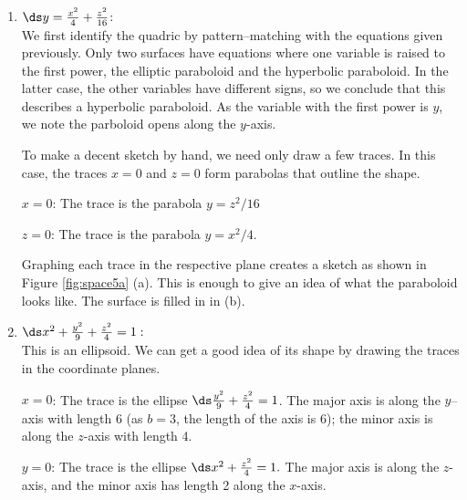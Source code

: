 {\begin{enumerate}
	\item $\ds y=\frac{x^2}{4}+\frac{z^2}{16}$:\\[5pt]
	We first identify the quadric by pattern--matching with the equations given previously. Only two surfaces have equations where one variable is raised to the first power, the elliptic paraboloid and the hyperbolic paraboloid. In the latter case, the other variables have different signs, so we conclude that this describes a hyperbolic paraboloid. As the variable with the first power is $y$, we note the parboloid opens along the $y$-axis. 
	
	To make a decent sketch by hand, we need only draw a few traces. In this case, the traces $x=0$ and $z=0$ form parabolas that outline the shape.
	
	$x=0$:	The trace is the parabola $y=z^2/16$
	
	$z=0$: 	The trace is the parabola $y=x^2/4$.
	
	Graphing each trace in the respective plane creates a sketch as shown in Figure \ref{fig:space5a} (a). This is enough to give an idea of what the paraboloid looks like. The surface is filled in in (b).
	
	\item		$\ds x^2+\frac{y^2}{9}+\frac{z^2}{4}=1:$\\[5pt]
	This is an ellipsoid. We can get a good idea of its shape by drawing the traces in the coordinate planes.
	
	$x=0$: 	The trace is the ellipse $\ds\frac{y^2}{9}+\frac{z^2}{4}=1$. The major axis is along the $y$--axis with length 6 (as $b=3$, the length of the axis is 6); the minor axis is along the $z$-axis with length 4.
	
	$y=0$:	The trace is the ellipse $\ds x^2+\frac{z^2}{4}=1.$ The major axis is along the $z$-axis, and the minor axis has length 2 along the $x$-axis.
	

\end{enumerate}}
